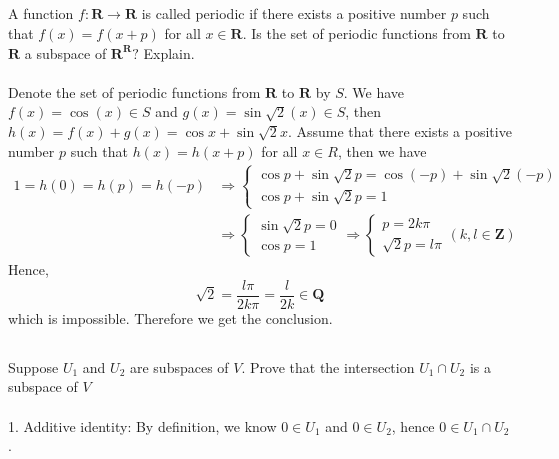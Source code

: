 \documentclass[a4paper]{article}
\begin{document}
\subsection{}
A function $f: \mathbf{R} \rightarrow \mathbf{R}$ is called periodic if there exists a positive number $p$ such that $f(x)=f(x+p)$ for all $x \in \mathbf{R} .$ Is the set of periodic functions from $\mathbf{R}$ to $\mathbf{R}$ a subspace of $\mathbf{R}^{\mathbf{R}} ?$ Explain.
\paragraph{}
Denote the set of periodic functions from $\mathbf{R}$ to $\mathbf{R}$ by $S$.
We have $f(x) = \cos(x) \in S$ and $g(x) = \sin\sqrt{2}(x) \in S$, then $h(x) = f(x) + g(x) = \cos x + \sin\sqrt{2}x$.
Assume that there exists a positive number $p$ such that $h(x) = h(x+p)$ for all $x\in R$, then we have
\[
    \begin{aligned}
        1 = h(0) = h(p) = h(-p)
         & \Rightarrow
        \begin{cases}
            \cos p + \sin\sqrt{2}p = \cos (-p) + \sin\sqrt{2}(-p) \\
            \cos p + \sin\sqrt{2}p = 1
        \end{cases} \\
         & \Rightarrow
        \begin{cases}
            \sin\sqrt{2}p = 0 \\
            \cos p = 1
        \end{cases}
        \Rightarrow
        \begin{cases}
            p = 2k\pi \\
            \sqrt{2}p=l\pi
        \end{cases}(k,l\in \mathbf{Z})
    \end{aligned}
\]
Hence,
\[
    \sqrt{2} = \frac{l\pi}{2k\pi} = \frac{l}{2k} \in \mathbf{Q}
\]
which is impossible. Therefore we get the conclusion.

\subsection{}
Suppose $U_{1}$ and $U_{2}$ are subspaces of $V .$ Prove that the intersection $U_{1} \cap U_{2}$ is a subspace of $V$
\paragraph{}
1. Additive identity: By definition, we know $0\in U_1$ and $0\in U_2$, hence $0\in U_1 \cap U_2$.
\end{document}
